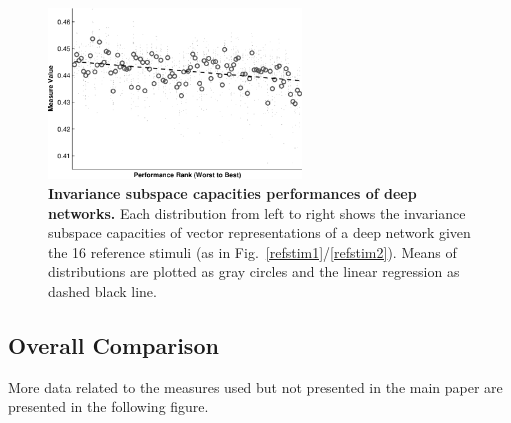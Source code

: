 \documentclass{article} %
\begin{document}
\begin{figure}[H]
\centering \includegraphics[width=0.60\textwidth]{Figs_supp/e_fig5b-crop.pdf}
\caption{ 
{\bf Invariance subspace capacities \vs performances of deep networks.} Each distribution from left to right shows the invariance subspace capacities of vector representations of a deep network given the 16 reference stimuli (as in Fig.~\ref{refstim1}/\ref{refstim2}). Means of distributions are plotted as gray circles and the linear regression as dashed black line.
}
\end{figure}

\clearpage

\subsection{Overall Comparison}

More data related to the measures used but not presented in the main paper are presented in the following figure.
\end{document}
